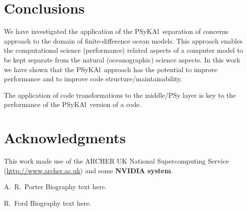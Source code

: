 \documentclass[journal]{IEEEtran}
\newcommand{\psykal}{{PS}y{KA}l\ }
\begin{document}
\section{Conclusions}

We have investigated the application of the \psykal separation of
concerns approach to the domain of finite-difference ocean
models. This approach enables the computational science (performance)
related aspects of a computer model to be kept separate from the
natural (oceanographic) science aspects. In this work we have shown
that the \psykal approach has the potential to improve performance and
to improve code structure/maintainability.

The application of code transformations to the middle/PSy layer is key
to the performance of the \psykal version of a code.




\section*{Acknowledgments}

This work made use of the ARCHER UK National Supercomputing Service
(\url{http://www.archer.ac.uk}) and some {\bf NVIDIA system}.



%

% 

\begin{IEEEbiographynophoto}{A.~R.~Porter}
Biography text here.
\end{IEEEbiographynophoto}

\begin{IEEEbiographynophoto}{R.~Ford}
Biography text here.
\end{IEEEbiographynophoto}
\end{document}
